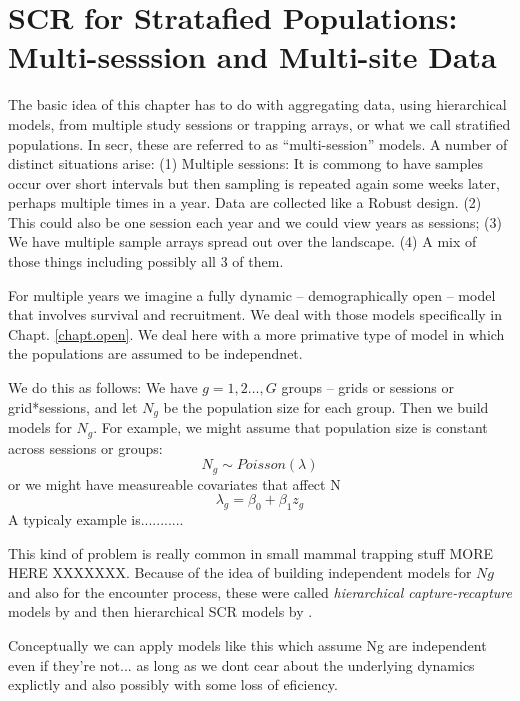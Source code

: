 \chapter{SCR for Stratafied Populations: 
Multi-sesssion and Multi-site Data}
\label{chapt.hscr}

\vspace{0.3cm}



The basic idea of this chapter has to do with aggregating data, using
hierarchical models, from multiple study sessions or trapping arrays,
or what we call stratified populations.  In secr, these are referred
to as ``multi-session'' models. 
A number of distinct situations arise:
(1) Multiple sessions:
It is commong to have samples occur over short intervals but then
sampling is repeated again some weeks later, perhaps multiple times in
a year.  Data are collected like a Robust design.
(2) This could also be one session each year and we could view years
as sessions;
(3) We have multiple sample arrays spread out over the landscape.
(4) A mix of those things including possibly all 3 of them.

For multiple years we imagine a fully dynamic -- demographically open
-- model that involves survival and recruitment. We deal with those
models specifically in Chapt. \ref{chapt.open}.
We deal here with a more primative type of model in which the
populations are assumed to be independnet. 

We do this as follows: We have $g=1,2\ldots, G$ groups -- grids or
sessions or grid*sessions, and let $N_{g}$ be the population size for
each group. Then we build models for $N_{g}$. For example, we might
assume that population size is constant across sessions or groups:
\[
 N_{g} \sim Poisson(\lambda)
\]
or we might have measureable covariates that affect N
\[
 \lambda_{g} = \beta_{0} + \beta_{1} z_{g}
\]
A typicaly example is...........

This kind of problem is really common in small mammal trapping stuff
\citep{converse_royle:xxxx} MORE HERE XXXXXXX.
Because of the idea of building independent models for $Ng$ and also
for the encounter process, these were called 
{\it hierarchical capture-recapture} models by \citep{royle_etal:2013}
and then hierarchical SCR models by \citep{converse_royle:2013}. 

Conceptually we can apply models like this which assume Ng are
independent even if they're not... as long as we dont cear about the
underlying dynamics explictly and also possibly with some loss of
eficiency. 

